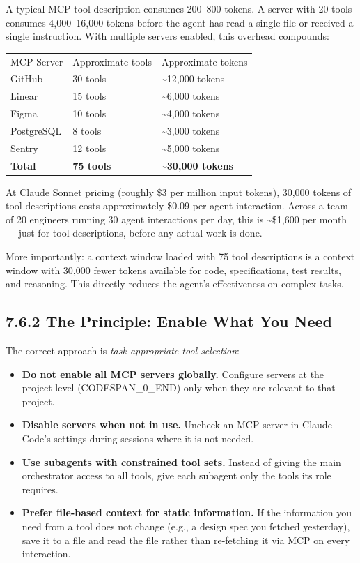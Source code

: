 \documentclass[11pt,a4paper]{book}
\begin{document}
A typical MCP tool description consumes 200--800 tokens. A server with 20 tools consumes 4,000--16,000 tokens before the agent has read a single file or received a single instruction. With multiple servers enabled, this overhead compounds:

\begin{tabular}{lll}
\hline
MCP Server & Approximate tools & Approximate tokens \\
GitHub & 30 tools & \textasciitilde{}12,000 tokens \\
Linear & 15 tools & \textasciitilde{}6,000 tokens \\
Figma & 10 tools & \textasciitilde{}4,000 tokens \\
PostgreSQL & 8 tools & \textasciitilde{}3,000 tokens \\
Sentry & 12 tools & \textasciitilde{}5,000 tokens \\
\textbf{Total} & \textbf{75 tools} & \textbf{\textasciitilde{}30,000 tokens} \\
\hline
\end{tabular}

At Claude Sonnet pricing (roughly \$3 per million input tokens), 30,000 tokens of tool descriptions costs approximately \$0.09 per agent interaction. Across a team of 20 engineers running 30 agent interactions per day, this is \textasciitilde{}\$1,600 per month --- just for tool descriptions, before any actual work is done.

More importantly: a context window loaded with 75 tool descriptions is a context window with 30,000 fewer tokens available for code, specifications, test results, and reasoning. This directly reduces the agent's effectiveness on complex tasks.

\subsection{7.6.2 The Principle: Enable What You Need}

The correct approach is \textit{task-appropriate tool selection}:

\begin{itemize}
  \item \textbf{Do not enable all MCP servers globally.} Configure servers at the project level (CODESPAN\_0\_END) only when they are relevant to that project.
  \item \textbf{Disable servers when not in use.} Uncheck an MCP server in Claude Code's settings during sessions where it is not needed.
  \item \textbf{Use subagents with constrained tool sets.} Instead of giving the main orchestrator access to all tools, give each subagent only the tools its role requires.
  \item \textbf{Prefer file-based context for static information.} If the information you need from a tool does not change (e.g., a design spec you fetched yesterday), save it to a file and read the file rather than re-fetching it via MCP on every interaction.
\end{itemize}
\end{document}
